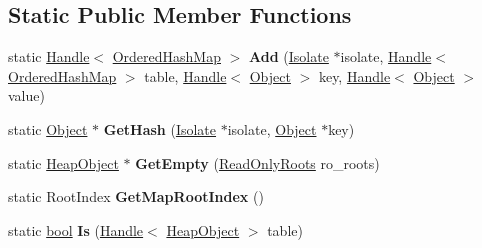 \subsection*{Static Public Member Functions}
\begin{DoxyCompactItemize}
\item 
\mbox{\label{classv8_1_1internal_1_1OrderedHashMap_a904afce7099ec89f1b07f35b9e097348}} 
static \mbox{\hyperlink{classv8_1_1internal_1_1Handle}{Handle}}$<$ \mbox{\hyperlink{classv8_1_1internal_1_1OrderedHashMap}{Ordered\+Hash\+Map}} $>$ {\bfseries Add} (\mbox{\hyperlink{classv8_1_1internal_1_1Isolate}{Isolate}} $\ast$isolate, \mbox{\hyperlink{classv8_1_1internal_1_1Handle}{Handle}}$<$ \mbox{\hyperlink{classv8_1_1internal_1_1OrderedHashMap}{Ordered\+Hash\+Map}} $>$ table, \mbox{\hyperlink{classv8_1_1internal_1_1Handle}{Handle}}$<$ \mbox{\hyperlink{classv8_1_1internal_1_1Object}{Object}} $>$ key, \mbox{\hyperlink{classv8_1_1internal_1_1Handle}{Handle}}$<$ \mbox{\hyperlink{classv8_1_1internal_1_1Object}{Object}} $>$ value)
\item 
\mbox{\label{classv8_1_1internal_1_1OrderedHashMap_afb1503ab8ff05e4cef4d5dbbc590b29f}} 
static \mbox{\hyperlink{classv8_1_1internal_1_1Object}{Object}} $\ast$ {\bfseries Get\+Hash} (\mbox{\hyperlink{classv8_1_1internal_1_1Isolate}{Isolate}} $\ast$isolate, \mbox{\hyperlink{classv8_1_1internal_1_1Object}{Object}} $\ast$key)
\item 
\mbox{\label{classv8_1_1internal_1_1OrderedHashMap_adedd6a6ded7fb4570730de5d804421a6}} 
static \mbox{\hyperlink{classv8_1_1internal_1_1HeapObject}{Heap\+Object}} $\ast$ {\bfseries Get\+Empty} (\mbox{\hyperlink{classv8_1_1internal_1_1ReadOnlyRoots}{Read\+Only\+Roots}} ro\+\_\+roots)
\item 
\mbox{\label{classv8_1_1internal_1_1OrderedHashMap_af3ba05cb453674fc284234ffb54ea925}} 
static Root\+Index {\bfseries Get\+Map\+Root\+Index} ()
\item 
\mbox{\label{classv8_1_1internal_1_1OrderedHashMap_ad3c04ec36ae3b597a6b8c8fa84a215b8}} 
static \mbox{\hyperlink{classbool}{bool}} {\bfseries Is} (\mbox{\hyperlink{classv8_1_1internal_1_1Handle}{Handle}}$<$ \mbox{\hyperlink{classv8_1_1internal_1_1HeapObject}{Heap\+Object}} $>$ table)
\end{DoxyCompactItemize}
